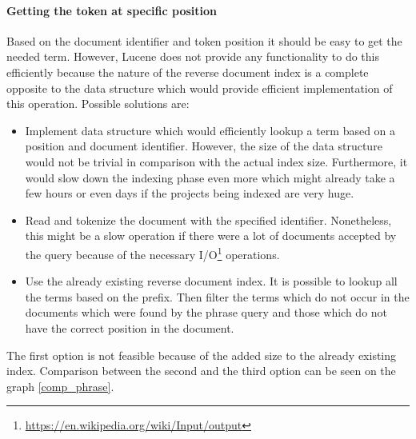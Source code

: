 \paragraph{Getting the token at specific position}
Based on the document identifier and token position it should be easy to get the needed term. However, Lucene does not
provide any functionality to do this efficiently because the nature of the reverse document index is a complete
opposite to the data structure which would provide efficient implementation of this operation. Possible solutions are:
\begin{itemize}
    \item Implement data structure which would efficiently lookup a term based on a position and document identifier.
    However, the size of the data structure would not be trivial in comparison with the actual index size. Furthermore,
    it would slow down the indexing phase even more which might already take a few hours or even days if the projects
    being indexed are very huge.
    \item Read and tokenize the document with the specified identifier. Nonetheless, this might be a slow operation if there
    were a lot of documents accepted by the query because of the necessary
    I/O\footnote{\url{https://en.wikipedia.org/wiki/Input/output}} operations.
    \item Use the already existing reverse document index. It is possible to lookup all the terms based on the prefix.
    Then filter the terms which do not occur in the documents which were found by the phrase query and those which
    do not have the correct position in the document.
\end{itemize}

The first option is not feasible because of the added size to the already existing index. Comparison between the
second and the third option can be seen on the graph \ref{comp_phrase}.

